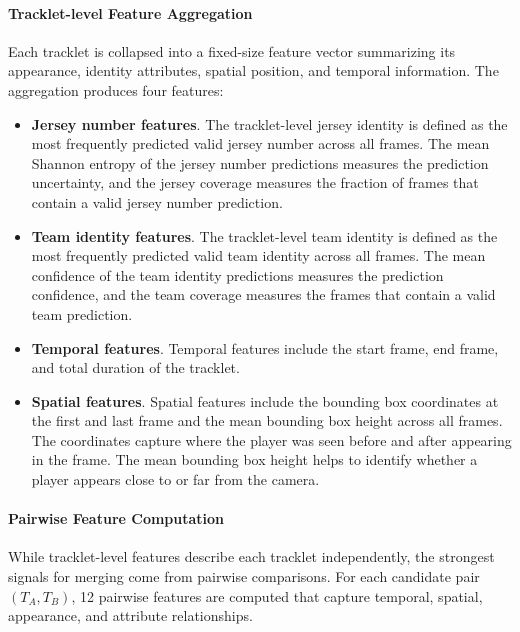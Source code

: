 \paragraph{Tracklet-level Feature Aggregation}
Each tracklet is collapsed into a fixed-size feature vector summarizing its appearance, identity attributes, spatial position, and temporal information. The aggregation produces four features:

\begin{itemize}
    \item \textbf{Jersey number features}. The tracklet-level jersey identity is defined as the most frequently predicted valid jersey number across all frames. The mean Shannon entropy of the jersey number predictions measures the prediction uncertainty, and the jersey coverage measures the fraction of frames that contain a valid jersey number prediction.

    \item \textbf{Team identity features}. The tracklet-level team identity is defined as the most frequently predicted valid team identity across all frames. The mean confidence of the team identity predictions measures the prediction confidence, and the team coverage measures the frames that contain a valid team prediction.

    \item \textbf{Temporal features}. Temporal features include the start frame, end frame, and total duration of the tracklet.

    \item \textbf{Spatial features}. Spatial features include the bounding box coordinates at the first and last frame and the mean bounding box height across all frames. The coordinates capture where the player was seen before and after appearing in the frame. The mean bounding box height helps to identify whether a player appears close to or far from the camera. 
\end{itemize}


\paragraph{Pairwise Feature Computation}
While tracklet-level features describe each tracklet independently, the strongest signals for merging come from pairwise comparisons. For each candidate pair $(T_A,T_B)$, 12 pairwise features are computed that capture temporal, spatial, appearance, and attribute relationships.

